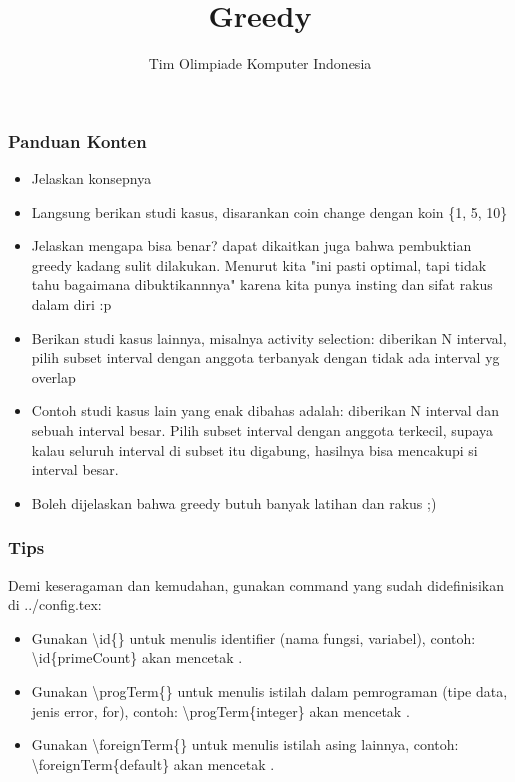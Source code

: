 

\title{Greedy}
\author{Tim Olimpiade Komputer Indonesia}
\date{}



\begin{frame}
\titlepage
\end{frame}

\begin{frame}
\frametitle{Panduan Konten}
\begin{itemize}
  \item Jelaskan konsepnya
  \item Langsung berikan studi kasus, disarankan coin change dengan koin \{1, 5, 10\}
  \item Jelaskan mengapa bisa benar? dapat dikaitkan juga bahwa pembuktian greedy kadang sulit dilakukan. Menurut kita "ini pasti optimal, tapi tidak tahu bagaimana dibuktikannnya" karena kita punya insting dan sifat rakus dalam diri :p
  \item Berikan studi kasus lainnya, misalnya activity selection: diberikan N interval, pilih subset interval dengan anggota terbanyak dengan tidak ada interval yg overlap
  \item Contoh studi kasus lain yang enak dibahas adalah: diberikan N interval dan sebuah interval besar. Pilih subset interval dengan anggota terkecil, supaya kalau seluruh interval di subset itu digabung, hasilnya bisa mencakupi si interval besar.
  \item Boleh dijelaskan bahwa greedy butuh banyak latihan dan rakus ;)
\end{itemize}
\end{frame}

\begin{frame}
\frametitle{Tips}
Demi keseragaman dan kemudahan, gunakan command yang sudah didefinisikan di ../config.tex:
\begin{itemize}
  \item Gunakan \textbackslash id\{\} untuk menulis identifier (nama fungsi, variabel), contoh: \textbackslash id\{primeCount\} akan mencetak .
  \item Gunakan \textbackslash progTerm\{\} untuk menulis istilah dalam pemrograman (tipe data, jenis error, for), contoh: \textbackslash progTerm\{integer\} akan mencetak .
  \item Gunakan \textbackslash foreignTerm\{\} untuk menulis istilah asing lainnya, contoh: \textbackslash foreignTerm\{default\} akan mencetak .
\end{itemize}
\end{frame}

